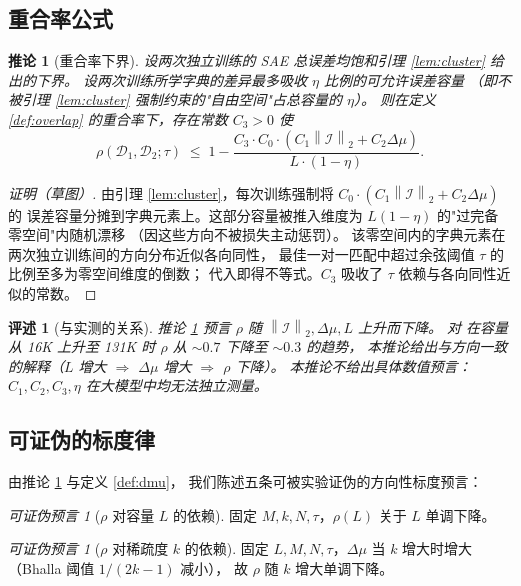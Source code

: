 \documentclass[11pt,a4paper]{article}
\newtheorem{corollary}[theorem]{推论}
\newtheorem{remark}[theorem]{评述}
\theoremstyle{remark}
\newtheorem{prediction}[theorem]{可证伪预言}
\newcommand{\I}{\mathcal{I}}
\newcommand{\Dict}{\mathcal{D}}
\newcommand{\norm}[1]{\left\lVert#1\right\rVert}
\begin{document}
\subsection{重合率公式}

\begin{corollary}[重合率下界]\label{cor:overlap}
设两次独立训练的 SAE 总误差均饱和引理 \ref{lem:cluster} 给出的下界。
设两次训练所学字典的差异最多吸收 $\eta$ 比例的可允许误差容量
（即不被引理 \ref{lem:cluster} 强制约束的"自由空间"占总容量的 $\eta$）。
则在定义 \ref{def:overlap} 的重合率下，存在常数 $C_3 > 0$ 使
\[
\rho(\Dict_1, \Dict_2; \tau)
\;\leq\;
1 - \frac{C_3 \cdot C_0 \cdot (C_1 \norm{\I}_2 + C_2 \Delta\mu)}{L \cdot (1 - \eta)}.
\]
\end{corollary}

\begin{proof}[证明（草图）]
由引理 \ref{lem:cluster}，每次训练强制将 $C_0 \cdot (C_1 \norm{\I}_2 + C_2 \Delta\mu)$ 的
误差容量分摊到字典元素上。这部分容量被推入维度为 $L(1 - \eta)$ 的"过完备零空间"内随机漂移
（因这些方向不被损失主动惩罚）。
该零空间内的字典元素在两次独立训练间的方向分布近似各向同性，
最佳一对一匹配中超过余弦阈值 $\tau$ 的比例至多为零空间维度的倒数；
代入即得不等式。$C_3$ 吸收了 $\tau$ 依赖与各向同性近似的常数。
\end{proof}

\begin{remark}[与实测的关系]
推论 \ref{cor:overlap} 预言 $\rho$ 随 $\norm{\I}_2, \Delta\mu, L$ 上升而下降。
对 \cite{paulo2025} 在容量从 16K 上升至 131K 时 $\rho$ 从 ${\sim}0.7$ 下降至 ${\sim}0.3$ 的趋势，
本推论给出与方向一致的解释（$L$ 增大 $\Rightarrow$ $\Delta\mu$ 增大 $\Rightarrow$ $\rho$ 下降）。
本推论\emph{不}给出具体数值预言：$C_1, C_2, C_3, \eta$ 在大模型中均无法独立测量。
\end{remark}

\subsection{可证伪的标度律}\label{sec:scaling}

由推论 \ref{cor:overlap} 与定义 \ref{def:dmu}，
我们陈述五条可被实验证伪的方向性标度预言：

\begin{prediction}[$\rho$ 对容量 $L$ 的依赖]\label{pred:L}
固定 $M, k, N, \tau$，$\rho(L)$ 关于 $L$ 单调下降。
\end{prediction}

\begin{prediction}[$\rho$ 对稀疏度 $k$ 的依赖]\label{pred:k}
固定 $L, M, N, \tau$，$\Delta\mu$ 当 $k$ 增大时增大（Bhalla 阈值 $1/(2k-1)$ 减小），
故 $\rho$ 随 $k$ 增大单调下降。
\end{prediction}
\end{document}
